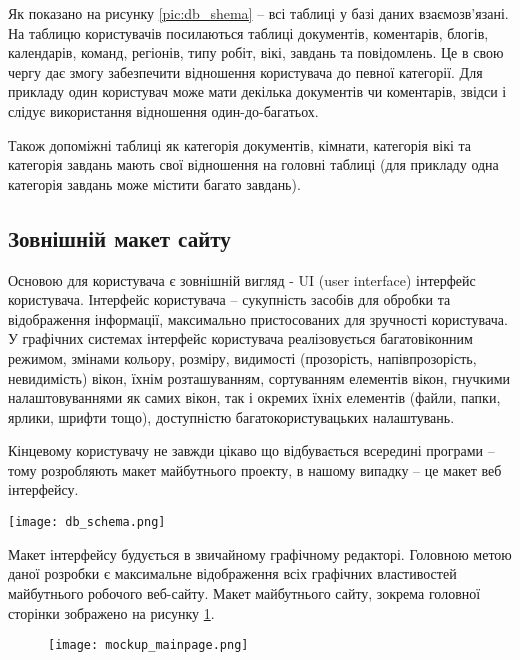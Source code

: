 \par Як показано на рисунку \ref{pic:db_shema} -- всі таблиці у базі даних взаємозв'язані. На таблицю користувачів посилаються таблиці документів, коментарів, блогів, календарів, команд, регіонів, типу робіт, вікі, завдань та повідомлень. 
Це в свою чергу дає змогу забезпечити відношення користувача до певної категорії. 
Для прикладу один користувач може мати декілька документів чи коментарів, звідси і слідує використання відношення один-до-багатьох. 
\par Також допоміжні таблиці як категорія документів, кімнати, категорія вікі та категорія завдань мають свої відношення на головні таблиці (для прикладу одна категорія завдань може містити багато завдань).

\subsection{Зовнішній макет сайту}
Основою для користувача є зовнішній вигляд - UI (user interface) інтерфейс користувача. 
Інтерфейс користувача -- сукупність засобів для обробки та відображення інформації, максимально пристосованих для зручності користувача. У графічних системах інтерфейс користувача реалізовується багатовіконним режимом, змінами кольору, розміру, видимості (прозорість, напівпрозорість, невидимість) вікон, їхнім розташуванням, сортуванням елементів вікон, гнучкими налаштовуваннями як самих вікон, так і окремих їхніх елементів (файли, папки, ярлики, шрифти тощо), доступністю багатокористувацьких налаштувань.

\par Кінцевому користувачу не завжди цікаво що відбувається всередині програми -- тому розробляють макет майбутнього проекту, в нашому випадку -- це макет веб інтерфейсу. 

	\begin{center}
		\texttt{[image: db\_schema.png]}
		\label{pic:db_shema}
	\end{center}

\par Макет інтерфейсу будується в звичайному графічному редакторі. Головною метою даної розробки є максимальне відображення всіх графічних властивостей майбутнього робочого веб-сайту. Макет майбутнього сайту, зокрема головної сторінки зображено на рисунку \ref{pic:mockup}.


\begin{figure}[!ht]
\centering
		\texttt{[image: mockup\_mainpage.png]}
		\vspace{18pt}
		\label{pic:mockup}
\end{figure}

